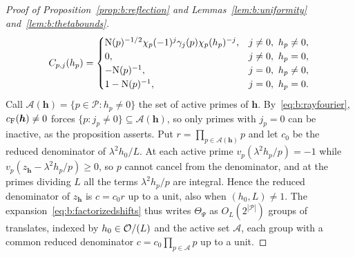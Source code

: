 \begin{proof}[Proof of Proposition~\ref{prop:b:reflection} and Lemmas~\ref{lem:b:uniformity} and~\ref{lem:b:thetabounds}]
\begin{equation}\label{eq:b:rayfourier}
  C_{p,j}(h_p)=\begin{cases}\NK(p)^{-1/2}\chi_p(-1)^j\gamma_j(p)\chi_p(h_p)^{-j},&j\ne0,\ h_p\ne0,\\0,&j\ne0,\ h_p=0,\\-\NK(p)^{-1},&j=0,\ h_p\ne0,\\1-\NK(p)^{-1},&j=0,\ h_p=0.\end{cases}
\end{equation}
Call $\mathcal A(\boldsymbol h)=\{p\in\mathcal P:h_p\ne0\}$ the set of active primes of $\boldsymbol h$. By~\eqref{eq:b:rayfourier}, $c_{\rm F}(\boldsymbol h)\ne0$ forces $\{p:j_p\ne0\}\subseteq\mathcal A(\boldsymbol h)$, so only primes with $j_p=0$ can be inactive, as the proposition asserts. Put $r=\prod_{p\in\mathcal A(\boldsymbol h)}p$ and let $c_0$ be the reduced denominator of $\lambda^2h_0/L$. At each active prime $v_p(\lambda^2h_p/p)=-1$ while $v_p(z_{\boldsymbol h}-\lambda^2h_p/p)\ge0$, so $p$ cannot cancel from the denominator, and at the primes dividing $L$ all the terms $\lambda^2h_p/p$ are integral. Hence the reduced denominator of $z_{\boldsymbol h}$ is $c=c_0r$ up to a unit, also when $(h_0,L)\ne1$. The expansion~\eqref{eq:b:factorizedshifts} thus writes $\Theta_\Psi$ as $O_L(2^{|\mathcal P|})$ groups of translates, indexed by $h_0\in\mathcal{O}/(L)$ and the active set $\mathcal A$, each group with a common reduced denominator $c=c_0\prod_{p\in\mathcal A}p$ up to a unit.\enlargethispage{3pt}


\end{proof}
